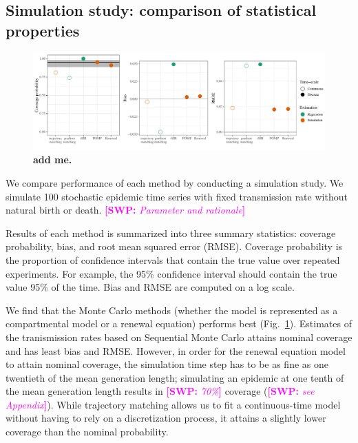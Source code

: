 \documentclass{article}
\newcommand{\fref}[1]{Fig.~\ref{fig:#1}}
\newcommand{\comment}[3]{\textcolor{#1}{\textbf{[#2: }\textsl{#3}\textbf{]}}}
\newcommand{\swp}[1]{\comment{magenta}{SWP}{#1}}
\begin{document}
\subsection{Simulation study: comparison of statistical properties}

\begin{figure}[!t]
\includegraphics[width=\textwidth]{../figure/compare_estimate_sir.pdf}
\caption{
\textbf{add me.}
}
\label{fig:coverage}
\end{figure}

We compare performance of each method by conducting a simulation study.
We simulate 100 stochastic epidemic time series with fixed transmission rate without natural birth or death.
\swp{Parameter and rationale} 

Results of each method is summarized into three summary statistics: coverage probability, bias, and root mean squared error (RMSE).
Coverage probability is the proportion of confidence intervals that contain the true value over repeated experiments. For example, the 95\% confidence interval should contain the true value 95\% of the time.
Bias and RMSE are computed on a log scale.

We find that the Monte Carlo methods (whether the model is represented as a compartmental model or a renewal equation) performs best (\fref{coverage}).
Estimates of the tranismission rates based on Sequential Monte Carlo attains nominal coverage and has least bias and RMSE.
However, in order for the renewal equation model to attain nominal coverage, the simulation time step has to be as fine as one twentieth of the mean generation length; simulating an epidemic at one tenth of the mean generation length results in \swp{70\%} coverage (\swp{see Appendix}).
While trajectory matching allows us to fit a continuous-time model without having to rely on a discretization process, it attains a slightly lower coverage than the nominal probability.
\end{document}

